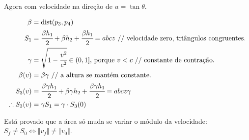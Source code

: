 \documentclass[12pt]{article}
\begin{document}
\vspace{100mm}

Agora com velocidade na dire\c{c}\~ao de $u = \tan \theta$.

\begin{align}
\beta &= \text{dist}(p_3, p_4) \\
S_1 &= \cfrac{\beta h_1}{2} + \beta h_2 + \cfrac{\beta h_1}{2} = abcz \text{ // velocidade zero, tri\^angulos congruentes.} \\
\gamma &= \sqrt{1 - \cfrac{v^2}{c^2}} \in (0, 1]\text{, porque }v < c\text{ // constante de contra\c{c}\~ao.} \\
\beta(v) &= \beta\gamma \text{ // a altura se mant\'em constante.} \\
S_3(v) &= \cfrac{\beta\gamma h_1}{2} + \beta\gamma h_2 + \cfrac{\beta\gamma h_1}{2} = abcz\gamma \\
\therefore S_3(v) &= \gamma S_1 = \gamma\cdot S_3(0)
\end{align}

Est\'a provado que a \'area s\'o muda se variar o m\'odulo da velocidade: $S_f \ne S_0 \Leftrightarrow \Vert v_f\Vert \ne \Vert v_0\Vert$.
\end{document}
